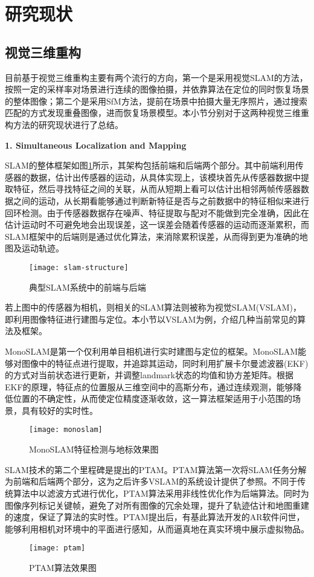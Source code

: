 \section{研究现状}
\subsection{视觉三维重构}
目前基于视觉三维重构主要有两个流行的方向，第一个是采用视觉SLAM的方法，按照一定的采样率对场景进行连续的图像拍摄，并依靠算法在定位的同时恢复场景的整体图像；第二个是采用SfM方法，提前在场景中拍摄大量无序照片，通过搜索匹配的方式发现重叠图像，进而恢复场景模型。本小节分别对于这两种视觉三维重构方法的研究现状进行了总结。

\textbf{1. Simultaneous Localization and Mapping}

SLAM的整体框架如图\ref{slam-structure}所示，其架构包括前端和后端两个部分\cite{cadena2016past}。其中前端利用传感器的数据，估计出传感器的运动，从具体实现上，该模块首先从传感器数据中提取特征，然后寻找特征之间的关联，从而从短期上看可以估计出相邻两帧传感器数据之间的运动，从长期看能够通过判断新特征是否与之前数据中的特征相似来进行回环检测。由于传感器数据存在噪声、特征提取与配对不能做到完全准确，因此在估计运动时不可避免地会出现误差，这一误差会随着传感器的运动而逐渐累积，而SLAM框架中的后端则是通过优化算法，来消除累积误差，从而得到更为准确的地图及运动轨迹。
\begin{figure}
	\centering
	\texttt{[image: slam-structure]}
	\caption{典型SLAM系统中的前端与后端}
	\label{slam-structure}
\end{figure}

若上图中的传感器为相机，则相关的SLAM算法则被称为视觉SLAM(VSLAM)，即利用图像特征进行建图与定位。本小节以VSLAM为例，介绍几种当前常见的算法及框架。

MonoSLAM是第一个仅利用单目相机进行实时建图与定位的框架\cite{davison2007monoslam}。MonoSLAM能够对图像中的特征点进行提取，并追踪其运动，同时利用扩展卡尔曼滤波器(EKF)的方式对当前状态进行更新，并调整landmark状态的均值和协方差矩阵。根据EKF的原理，特征点的位置服从三维空间中的高斯分布，通过连续观测，能够降低位置的不确定性，从而使定位精度逐渐收敛，这一算法框架适用于小范围的场景，具有较好的实时性。
\begin{figure}
	\centering
	\texttt{[image: monoslam]}
	\caption{MonoSLAM特征检测与地标效果图}
	\label{monoslam}
\end{figure}

SLAM技术的第二个里程碑是\citet{klein2007parallel}提出的PTAM。PTAM算法第一次将SLAM任务分解为前端和后端两个部分，这为之后许多VSLAM的系统设计提供了参照。不同于传统算法中以滤波方式进行优化，PTAM算法采用非线性优化作为后端算法。同时为图像序列标记关键帧，避免了对所有图像的冗余处理，提升了轨迹估计和地图重建的速度，保证了算法的实时性。PTAM提出后，有基此算法开发的AR软件问世，能够利用相机对环境中的平面进行感知，从而逼真地在真实环境中展示虚拟物品。
\begin{figure}
	\centering
	\texttt{[image: ptam]}
	\caption{PTAM算法效果图}
	\label{ptam}
\end{figure}

